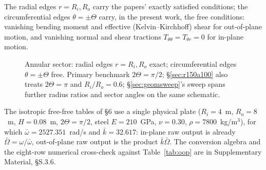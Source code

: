 \documentclass[11pt]{article}
\begin{document}
The radial edges $r=R_i,R_o$ carry the papers' exactly satisfied
conditions; the circumferential edges $\theta=\pm\Theta$ carry, in the
present work, the free conditions: vanishing bending moment and effective
(Kelvin--Kirchhoff) shear for out-of-plane motion, and vanishing normal and shear
tractions $T_{\theta\theta}=T_{\theta r}=0$ for in-plane motion.
\begin{figure}[h]\centering
{}
\caption{Annular sector: radial edges $r=R_i,R_o$ exact; circumferential
edges $\theta=\pm\Theta$ free. Primary benchmark $2\Theta=\pi/2$;
\S\ref{sec:r150a100} also treats $2\Theta=\pi$ and $R_i/R_o=0.6$;
\S\ref{sec:geomsweep}'s sweep spans further radius ratios and sector
angles on the same schematic.}
\label{fig:geometry}
\end{figure}
The isotropic free-free tables of \S6 use a single physical plate
($R_i=4$~m, $R_o=8$~m, $H=0.08$~m, $2\Theta=\pi/2$, steel
$E=210$~GPa, $\nu=0.30$, $\rho=7800$~kg/m$^3$), for which
$\bar\omega=2527.351$~rad/s and $\bar k=32.617$: in-plane raw output is
already $\bar\Omega=\omega/\bar\omega$, out-of-plane raw output is the
product $\bar k\bar\Omega$. The conversion algebra and the eight-row
numerical cross-check against Table~\ref{tab:oop} are in Supplementary
Material, §S.3.6.
\end{document}
